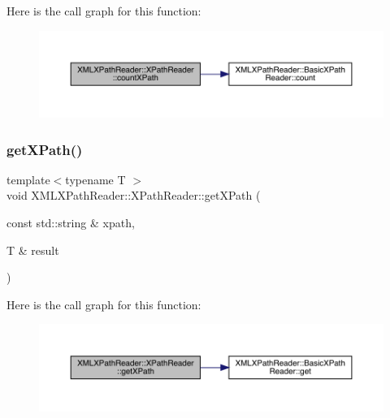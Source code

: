 Here is the call graph for this function\+:
\nopagebreak
\begin{figure}[H]
\begin{center}
\leavevmode
\includegraphics[width=350pt]{d3/d5a/classXMLXPathReader_1_1XPathReader_a9fd76703ea5321a4666ca9a0c07a222a_cgraph}
\end{center}
\end{figure}
\mbox{\label{classXMLXPathReader_1_1XPathReader_abbd673bc00e75502126b2cca246ff6f4}} 
\subsubsection{\texorpdfstring{getXPath()}{getXPath()}\hspace{0.1cm}{\footnotesize\ttfamily [1/9]}}
{\footnotesize\ttfamily template$<$typename T $>$ \\
void X\+M\+L\+X\+Path\+Reader\+::\+X\+Path\+Reader\+::get\+X\+Path (\begin{DoxyParamCaption}\item[{const std\+::string \&}]{xpath,  }\item[{T \&}]{result }\end{DoxyParamCaption})\hspace{0.3cm}{\ttfamily [inline]}}

Here is the call graph for this function\+:
\nopagebreak
\begin{figure}[H]
\begin{center}
\leavevmode
\includegraphics[width=350pt]{d3/d5a/classXMLXPathReader_1_1XPathReader_abbd673bc00e75502126b2cca246ff6f4_cgraph}
\end{center}
\end{figure}
\mbox{\label{classXMLXPathReader_1_1XPathReader_abbd673bc00e75502126b2cca246ff6f4}} 
